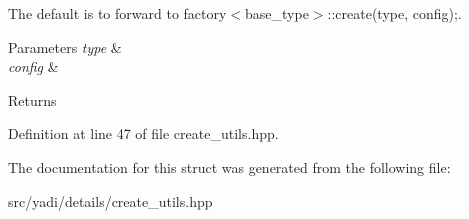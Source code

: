 The default is to forward to factory$<$base\+\_\+type$>$\+::create(type, config);. 


\begin{DoxyParams}{Parameters}
{\em type} & \\
\hline
{\em config} & \\
\hline
\end{DoxyParams}
\begin{DoxyReturn}{Returns}

\end{DoxyReturn}


Definition at line 47 of file create\+\_\+utils.\+hpp.



The documentation for this struct was generated from the following file\+:\begin{DoxyCompactItemize}
\item 
src/yadi/details/create\+\_\+utils.\+hpp\end{DoxyCompactItemize}
